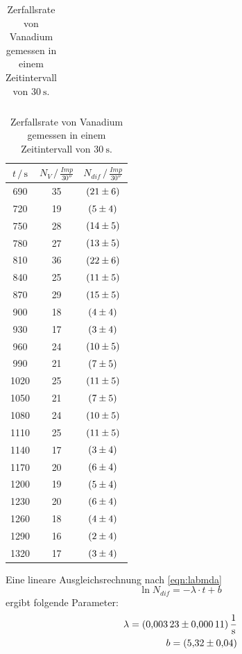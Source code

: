 \begin{table}
\begin{tabular}{ccc|}
    \bottomrule
    \end{tabular}
    \begin{tabular}{|ccc}
    \toprule
    $t \,/\, \si{\second}$ & $N_V \,/\, \si{\frac{Imp}{30 \second}}$ & $N_{dif} \,/\, \si{\frac{Imp}{30 \second}}$ \\
    \midrule
    690	& 35 & $\SI{21+-6}{}$ \\
    720	& 19 & $\SI{5+-4}{} $\\
    750	& 28 & $\SI{14+-5}{}$ \\
    780	& 27 & $\SI{13+-5}{}$ \\
    810	& 36 & $\SI{22+-6}{}$ \\
    840	& 25 & $\SI{11+-5}{}$ \\
    870	& 29 & $\SI{15+-5}{}$ \\
    900	& 18 & $\SI{4+-4}{} $\\
    930	& 17 & $\SI{3+-4}{} $\\
    960	& 24 & $\SI{10+-5}{}$ \\
    990	& 21 & $\SI{7+-5}{} $\\
    1020 & 25 & $\SI{11+-5}{}$ \\
    1050 & 21 & $\SI{7+-5}{} $\\
    1080 & 24 & $\SI{10+-5}{}$ \\
    1110 & 25 & $\SI{11+-5}{}$ \\
    1140 & 17 & $\SI{3+-4}{} $\\
    1170 & 20 & $\SI{6+-4}{} $\\
    1200 & 19 & $\SI{5+-4}{} $\\
    1230 & 20 & $\SI{6+-4}{} $\\
    1260 & 18 & $\SI{4+-4}{} $\\
    1290 & 16 & $\SI{2+-4}{} $\\
    1320 & 17 & $\SI{3+-4}{} $\\
    \bottomrule
    \end{tabular}
    \caption{Zerfallsrate von Vanadium gemessen in einem Zeitintervall von $\SI{30}{\second}$.}
    \label{tab:vanadium}
\end{table}
Eine lineare Ausgleichsrechnung nach \eqref{eqn:labmda}
\begin{equation*}
    \ln N_{dif} = -\lambda \cdot t + b
\end{equation*}
ergibt folgende Parameter:
\begin{align*}
    \lambda = \SI{0.00323+-0.00011}{\frac{1}{\second}} \\
    b = \SI{5.32+-0.04}{}
\end{align*}
